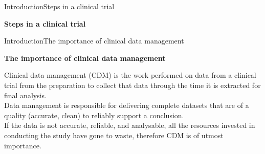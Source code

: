 \documentclass[xcolor=dvipsnames,11pt]{beamer}
\begin{document}
\begin{frame}[fragile]{Introduction}{Steps in a clinical trial}
	\begin{center}
		\textbf{Steps in a clinical trial}
	\end{center}
\end{frame}



\begin{frame}[fragile]{Introduction}{The importance of clinical data management}

	\textbf{The importance of clinical data management}\\
	\bigskip

	Clinical data management (CDM) is the work performed on data from a clinical trial from the preparation to collect that data through the time it is extracted for final analysis.\\
	\bigskip
	Data management is responsible for delivering complete datasets that are of a quality (accurate, clean) to reliably support a conclusion.\\
	\bigskip
	If the data is not accurate, reliable, and analysable, all the resources invested in conducting the study have gone to waste, therefore CDM is of utmost importance. 
\end{frame}
\end{document}

